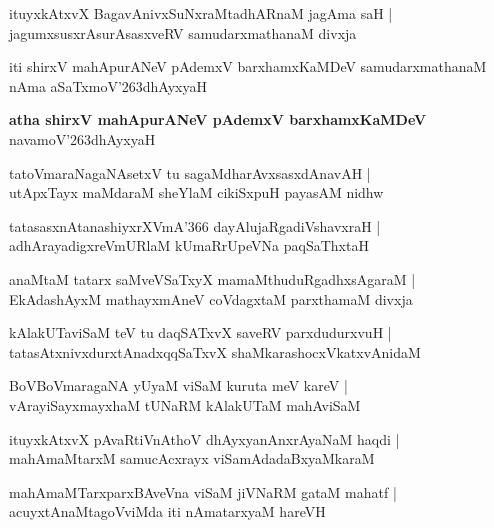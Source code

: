 \begin{shloka}
ituyxkAtxvX BagavAnivxSuNxraMtadhARnaM jagAma saH |\\
jagumxsusxrAsurAsasxveRV samudarxmathanaM divxja
\end{shloka}
iti shirxV mahApurANeV pAdemxV barxhamxKaMDeV samudarxmathanaM nAma aSaTxmoV\char'263dhAyxyaH 

\begin{center}
\textbf{\large atha shirxV mahApurANeV pAdemxV barxhamxKaMDeV}\\
navamoV\char'263dhAyxyaH
\end{center}

\setcounter{shloka}{0}
\begin{shloka}
tatoVmaraNagaNAsetxV tu sagaMdharAvxsasxdAnavAH |\\
utApxTayx maMdaraM sheYlaM cikiSxpuH payasAM nidhw
\end{shloka}

\begin{shloka}
tatasasxnAtanashiyxrXVmA\char'366 dayAlujaRgadiVshavxraH |\\
adhArayadigxreVmURlaM kUmaRrUpeVNa paqSaThxtaH
\end{shloka}

\begin{shloka}
anaMtaM tatarx saMveVSaTxyX mamaMthuduRgadhxsAgaraM |\\
EkAdashAyxM mathayxmAneV coVdagxtaM parxthamaM divxja
\end{shloka}

\begin{shloka}
kAlakUTaviSaM teV tu daqSATxvX saveRV parxdudurxvuH |\\
tatasAtxnivxdurxtAnadxqqSaTxvX shaMkarashocxVkatxvAnidaM 
\end{shloka}

\begin{shloka}
BoVBoVmaragaNA yUyaM viSaM kuruta meV kareV |\\
vArayiSayxmayxhaM tUNaRM kAlakUTaM mahAviSaM
\end{shloka}

\begin{shloka}
ituyxkAtxvX pAvaRtiVnAthoV dhAyxyanAnxrAyaNaM haqdi |\\
mahAmaMtarxM samucAcxrayx viSamAdadaBxyaMkaraM
\end{shloka}

\begin{shloka}
mahAmaMTarxparxBAveVna viSaM jiVNaRM gataM mahatf |\\
acuyxtAnaMtagoVviMda iti nAmatarxyaM hareVH
\end{shloka}

